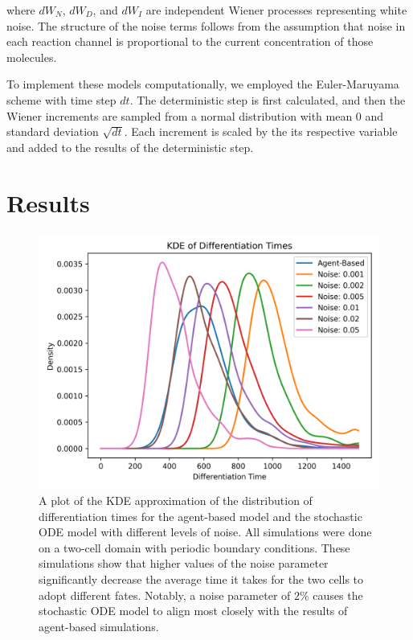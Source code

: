 \documentclass{article}
\begin{document}
\begin{flushleft}
where $dW_N$, $dW_D$, and $dW_I$ are independent Wiener processes representing white noise.
The structure of the noise terms follows from the assumption that noise in each reaction channel is proportional to the current concentration of those molecules.

\medskip

To implement these models computationally, we employed the Euler-Maruyama scheme with time step $dt$.
The deterministic step is first calculated, and then the Wiener increments are sampled from a normal distribution with mean 0 and standard deviation $\sqrt{dt}$.
Each increment is scaled by the its respective variable and added to the results of the deterministic step.

\section*{Results}


\begin{figure}
  \includegraphics[width=\textwidth]{img/vis11.png}
  \caption{A plot of the KDE approximation of the distribution of differentiation times for the agent-based model and the stochastic ODE model with different levels of noise. All simulations were done on a two-cell domain with periodic boundary conditions. These simulations show that higher values of the noise parameter significantly decrease the average time it takes for the two cells to adopt different fates. Notably, a noise parameter of $2\%$ causes the stochastic ODE model to align most closely with the results of agent-based simulations. }
\end{figure}


\end{flushleft}
\end{document}
